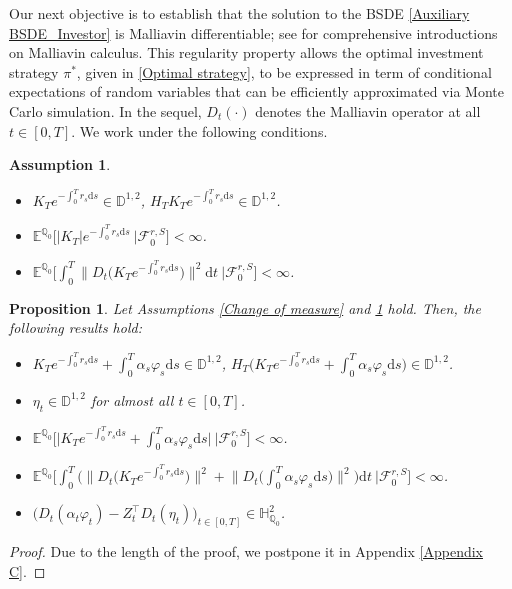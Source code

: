 \documentclass[12,reqno]{amsart}
\numberwithin{equation}{section}
\newtheorem{assum}[defi]{Assumption}
\newtheorem{prop}[defi]{Proposition}
\begin{document}
Our next objective is to establish that the solution to the BSDE \eqref{Auxiliary BSDE_Investor} is Malliavin differentiable; see \cite{alos2024malliavin,nunno2008malliavin,nualart2006malliavin} for comprehensive introductions on Malliavin calculus. This regularity property allows the optimal investment strategy $\pi^{*}$, given in \eqref{Optimal strategy}, to be expressed in term of conditional expectations of random variables that can be efficiently approximated via Monte Carlo simulation. In the sequel, $D_{t}(\cdot)$ denotes the Malliavin operator at all $t\in[0,T]$. We work under the following conditions.
\begin{assum}\label{Conditions to be Malliavin differentiable}\leavevmode
	\begin{itemize}
		\item[$(i)$] $K_{T}e^{-\int_{0}^{T}r_{s}\mathrm{d}s}\in\mathbb{D}^{1,2}$, $H_{T}K_{T}e^{-\int_{0}^{T}r_{s}\mathrm{d}s}\in\mathbb{D}^{1,2}$.
		\item[$(ii)$] $\mathbb{E}^{\mathbb{Q}_{0}}\Big[\big|K_{T}\big|e^{-\int_{0}^{T}r_{s}\mathrm{d}s}~\big|\mathcal{F}_{0}^{r,S}\Big]<\infty$.
		\item[$(iii)$] $\mathbb{E}^{\mathbb{Q}_{0}}\Big[\int_{0}^{T}\big\|D_{t}\big(K_{T}e^{-\int_{0}^{T}r_{s}\mathrm{d}s}\big)\big\|^{2}\mathrm{d}t~\big|\mathcal{F}_{0}^{r,S}\Big]<\infty$.
	\end{itemize}
\end{assum}
\begin{prop}\label{Auxilliary results_Malliavin differentiability}
	Let Assumptions \ref{Change of measure} and \ref{Conditions to be Malliavin differentiable} hold. Then, the following results hold:
	\begin{itemize}
		\item[$(i)$] $K_{T}e^{-\int_{0}^{T}r_{s}\mathrm{d}s}+\int_{0}^{T}\alpha_{s}\varphi_{s}\mathrm{d}s\in\mathbb{D}^{1,2}$, $H_{T}\Big(K_{T}e^{-\int_{0}^{T}r_{s}\mathrm{d}s}+\int_{0}^{T}\alpha_{s} \varphi_{s}\mathrm{d}s\Big)\in\mathbb{D}^{1,2}$.
		\item[$(ii)$] $\eta_{t}\in\mathbb{D}^{1,2}$ for almost all $t\in[0,T]$.
		\item[$(iii)$] $\mathbb{E}^{\mathbb{Q}_{0}}\Big[\big|K_{T}e^{-\int_{0}^{T}r_{s}\mathrm{d}s}+\int_{0}^{T}\alpha_{s}\varphi_{s}\mathrm{d}s\big|~\big|\mathcal{F}_{0}^{r,S}\Big]<\infty$.
		\item[$(iv)$] $\mathbb{E}^{\mathbb{Q}_{0}}\Big[\int_{0}^{T}\Big(\big\|D_{t}\big(K_{T}e^{-\int_{0}^{T}r_{s}\mathrm{d}s}\big)\big\|^{2}+\big\|D_{t}\big(\int_{0}^{T}\alpha_{s}\varphi_{s}\mathrm{d}s\big)\big\|^{2}\Big)\mathrm{d}t~\big|\mathcal{F}_{0}^{r,S}\Big]<\infty$.
		\item[$(v)$] $\big(D_{t}(\alpha_{t}\varphi_{t})-Z_{t}^{\top}D_{t}(\eta_{t})\big)_{t\in[0,T]}\in\mathbb{H}_{\mathbb{Q}_{0}}^{2}$.
	\end{itemize}
\end{prop}
\begin{proof}
	Due to the length of the proof, we postpone it in Appendix \ref{Appendix C}.
\end{proof}
\end{document}
